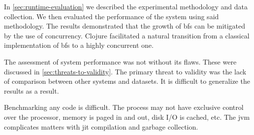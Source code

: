		In \cref{sec:runtime-evaluation} we described the experimental methodology and data collection.  We then evaluated the performance of the system using said methodology.  The results demonstrated that the growth of \gls{bfs} can be mitigated by the use of concurrency.  Clojure facilitated a natural transition from a classical implementation of \gls{bfs} to a highly concurrent one.
		
		The assessment of system performance was not without its flaws.  These were discussed in \cref{sec:threats-to-validity}.  The primary threat to validity was the lack of comparison between other systems and datasets.  It is difficult to generalize the results as a result.
		
		Benchmarking any code is difficult.  The process may not have exclusive control over the processor, memory is paged in and out, disk I/O is cached, etc.  The \gls{jvm} complicates matters with \gls{jit} compilation and garbage collection.
